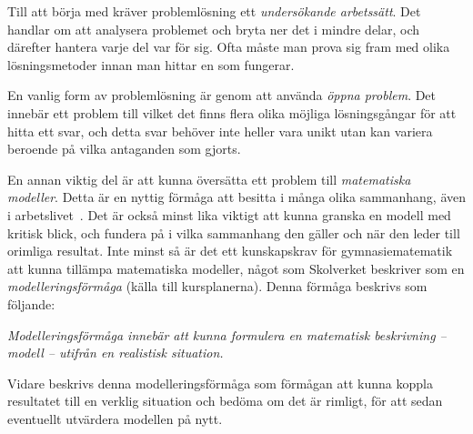 
\textcolor{lila}{
    Till att börja med kräver problemlösning ett \textsl{undersökande arbetssätt}. Det handlar om att analysera problemet och bryta ner det i mindre delar, och därefter hantera varje del var för sig. Ofta måste man prova sig fram med olika lösningsmetoder innan man hittar en som fungerar.
}
        
\textcolor{lila}{
    En vanlig form av problemlösning är genom att använda \textsl{öppna problem}. Det innebär ett  problem till vilket det finns flera olika möjliga lösningsgångar för att hitta ett svar, och detta svar behöver inte heller vara unikt utan kan variera beroende på vilka antaganden som gjorts.
}

\textcolor{lila}{
    En annan viktig del är att kunna översätta ett problem till \textsl{matematiska modeller}. Detta är en nyttig förmåga att besitta i många olika sammanhang, även i arbetslivet~\cite{TheElephant}. Det är också minst lika viktigt att kunna granska en modell med kritisk blick, och fundera på i vilka sammanhang den gäller och när den leder till orimliga resultat.
}
\textcolor{Mahogany}{Inte minst så är det ett kunskapskrav för gymnasiematematik att kunna tillämpa matematiska modeller, något som Skolverket beskriver som en \textsl{modelleringsförmåga} \cite{ProblemDef} (källa till kursplanerna). Denna förmåga beskrivs som följande:}

\begin{displayquote}
    \textcolor{Mahogany}{
        \textsl{Modelleringsförmåga innebär att kunna formulera en matematisk beskrivning – modell – utifrån en realistisk situation.}
    }
\end{displayquote}
\noindent\textcolor{Mahogany}{Vidare beskrivs denna modelleringsförmåga som förmågan att kunna koppla resultatet till en verklig situation och bedöma om det är rimligt, för att sedan eventuellt utvärdera modellen på nytt.}
